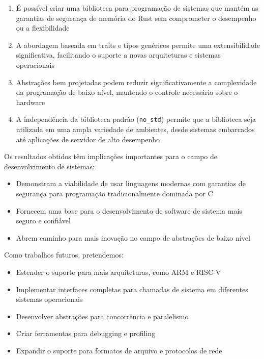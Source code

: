 \documentclass[12pt,a4paper]{article}
\begin{document}
\begin{enumerate}
    \item É possível criar uma biblioteca para programação de sistemas que mantém as garantias de segurança de memória do Rust sem comprometer o desempenho ou a flexibilidade

    \item A abordagem baseada em traits e tipos genéricos permite uma extensibilidade significativa, facilitando o suporte a novas arquiteturas e sistemas operacionais

    \item Abstrações bem projetadas podem reduzir significativamente a complexidade da programação de baixo nível, mantendo o controle necessário sobre o hardware

    \item A independência da biblioteca padrão (\texttt{no\_std}) permite que a biblioteca seja utilizada em uma ampla variedade de ambientes, desde sistemas embarcados até aplicações de servidor de alto desempenho
\end{enumerate}

Os resultados obtidos têm implicações importantes para o campo de desenvolvimento de sistemas:

\begin{itemize}
    \item Demonstram a viabilidade de usar linguagens modernas com garantias de segurança para programação tradicionalmente dominada por C
    \item Fornecem uma base para o desenvolvimento de software de sistema mais seguro e confiável
    \item Abrem caminho para mais inovação no campo de abstrações de baixo nível
\end{itemize}

Como trabalhos futuros, pretendemos:

\begin{itemize}
    \item Estender o suporte para mais arquiteturas, como ARM e RISC-V
    \item Implementar interfaces completas para chamadas de sistema em diferentes sistemas operacionais
    \item Desenvolver abstrações para concorrência e paralelismo
    \item Criar ferramentas para debugging e profiling
    \item Expandir o suporte para formatos de arquivo e protocolos de rede
\end{itemize}
\end{document}
